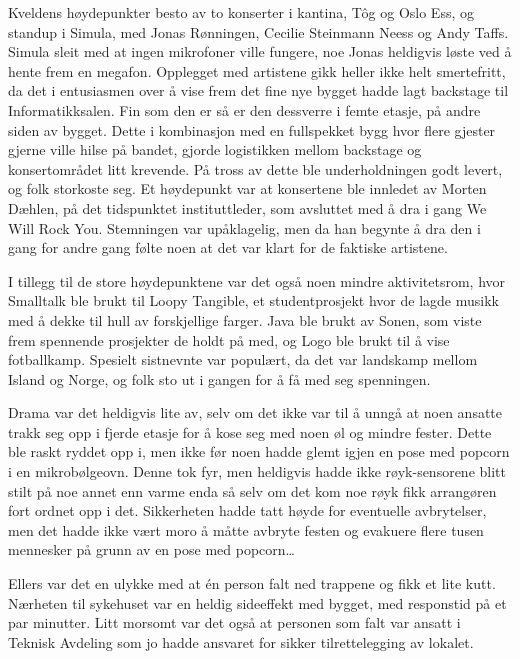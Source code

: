 Kveldens høydepunkter besto av to konserter i kantina, Tôg og Oslo Ess, og standup i Simula, med Jonas Rønningen, Cecilie Steinmann Neess og Andy Taffs. Simula sleit med at ingen mikrofoner ville fungere, noe Jonas heldigvis løste ved å hente frem en megafon. Opplegget med artistene gikk heller ikke helt smertefritt, da det i entusiasmen over å vise frem det fine nye bygget hadde lagt backstage til Informatikksalen. Fin som den er så er den dessverre i femte etasje, på andre siden av bygget. Dette i kombinasjon med en fullspekket bygg hvor flere gjester gjerne ville hilse på bandet, gjorde logistikken mellom backstage og konsertområdet litt krevende. På tross av dette ble underholdningen godt levert, og folk storkoste seg. Et høydepunkt var at konsertene ble innledet av Morten Dæhlen, på det tidspunktet instituttleder, som avsluttet med å dra i gang We Will Rock You. Stemningen var upåklagelig, men da han begynte å dra den i gang for andre gang følte noen at det var klart for de faktiske artistene.

I tillegg til de store høydepunktene var det også noen mindre aktivitetsrom, hvor Smalltalk ble brukt til Loopy Tangible, et studentprosjekt hvor de lagde musikk med å dekke til hull av forskjellige farger. Java ble brukt av Sonen, som viste frem spennende prosjekter de holdt på med, og Logo ble brukt til å vise fotballkamp. Spesielt sistnevnte var populært, da det var landskamp mellom Island og Norge, og folk sto ut i gangen for å få med seg spenningen.

Drama var det heldigvis lite av, selv om det ikke var til å unngå at noen ansatte trakk seg opp i fjerde etasje for å kose seg med noen øl og mindre fester. Dette ble raskt ryddet opp i, men ikke før noen hadde glemt igjen en pose med popcorn i en mikrobølgeovn. Denne tok fyr, men heldigvis hadde ikke røyk-sensorene blitt stilt på noe annet enn varme enda så selv om det kom noe røyk fikk arrangøren fort ordnet opp i det. Sikkerheten hadde tatt høyde for eventuelle avbrytelser, men det hadde ikke vært moro å måtte avbryte festen og evakuere flere tusen mennesker på grunn av en pose med popcorn…

Ellers var det en ulykke med at én person falt ned trappene og fikk et lite kutt. Nærheten til sykehuset var en heldig sideeffekt med bygget, med responstid på et par minutter. Litt morsomt var det også at personen som falt var ansatt i Teknisk Avdeling som jo hadde ansvaret for sikker tilrettelegging av lokalet.

